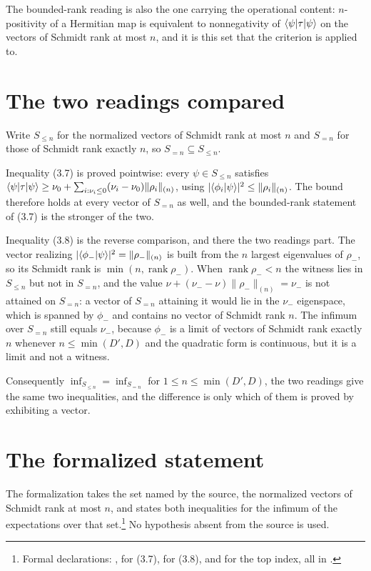 \documentclass[11pt]{article}
\begin{document}
The bounded-rank reading is also the one carrying the operational content:
$n$-positivity of a Hermitian map is equivalent to nonnegativity of
$\langle \psi|\tau|\psi\rangle$ on the vectors of Schmidt rank at most $n$, and it is
this set that the criterion is applied to.

\section{The two readings compared}

Write $S_{\le n}$ for the normalized vectors of Schmidt rank at most $n$ and
$S_{=n}$ for those of Schmidt rank exactly $n$, so $S_{=n}\subseteq S_{\le n}$.

Inequality (3.7) is proved pointwise: every $\psi\in S_{\le n}$ satisfies
$\langle \psi|\tau|\psi\rangle\ge\nu_0+\sum_{i:\nu_i\le0}(\nu_i-\nu_0)\|\rho_i\|_{(n)}$,
using $|\langle \phi_i | \psi \rangle|^2\le\|\rho_i\|_{(n)}$. The bound therefore holds
at every vector of $S_{=n}$ as well, and the bounded-rank statement of (3.7) is
the stronger of the two.

Inequality (3.8) is the reverse comparison, and there the two readings part. The
vector realizing $|\langle \phi_- | \psi \rangle|^2=\|\rho_-\|_{(n)}$ is built from the
$n$ largest eigenvalues of $\rho_-$, so its Schmidt rank is
$\min(n,\operatorname{rank}\rho_-)$. When $\operatorname{rank}\rho_-<n$ the
witness lies in $S_{\le n}$ but not in $S_{=n}$, and the value $\nu+(\nu_--\nu)\|\rho_-\|_{(n)}=\nu_-$ is not
attained on $S_{=n}$: a vector of $S_{=n}$ attaining it would lie in the
$\nu_-$ eigenspace, which is spanned by $\phi_-$ and contains no vector of
Schmidt rank $n$. The infimum over $S_{=n}$ still equals $\nu_-$, because
$\phi_-$ is a limit of vectors of Schmidt rank exactly $n$ whenever
$n\le\min(D',D)$ and the quadratic form is continuous, but it is a limit and not
a witness.

Consequently $\inf_{S_{\le n}}=\inf_{S_{=n}}$ for $1\le n\le\min(D',D)$, the two
readings give the same two inequalities, and the difference is only which of
them is proved by exhibiting a vector.

\section{The formalized statement}

The formalization takes the set named by the source, the normalized vectors of
Schmidt rank at most $n$, and states both inequalities for the infimum of the
expectations over that set.\footnote{Formal declarations:
  ,
   for (3.7),
   for (3.8), and
   for the top
  index, all in
  .} No hypothesis absent
from the source is used.
\end{document}
